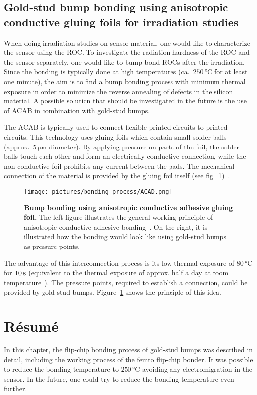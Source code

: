 \subsection{Gold-stud bump bonding using anisotropic conductive gluing foils for irradiation studies}
When doing irradiation studies on sensor material, one would like to characterize the sensor using the \ac{ROC}. To investigate the radiation hardness of the \ac{ROC} and the sensor separately, one would like to bump bond \ac{ROC}s after the irradiation. Since the bonding is typically done at high temperatures (ca.~$250\,\si{\degreeCelsius}$ for at least one minute), the aim is to find a bump bonding process with minimum thermal exposure in order to minimize the reverse annealing of defects in the silicon material. A possible solution that should be investigated in the future is the use of \ac{ACAB} in combination with gold-stud bumps.

The \ac{ACAB} is typically used to connect flexible printed circuits to printed circuits. This technology uses gluing foils which contain small solder balls (approx.~$5\,\si{\micro \meter}$ diameter). By applying pressure on parts of the foil, the solder balls touch each other and form an electrically conductive connection, while the non-conductive foil prohibits any current between the pads. The mechanical connection of the material is provided by the gluing foil itself (see fig.~\ref{fig:ASAB})~\cite{MIY10}.
\begin{figure}
\begin{center}
\texttt{[image: pictures/bonding\_process/ACAD.png]}
\end{center}
\caption[Bump bonding using anisotropic conductive adhesive gluing foil]{\textbf{Bump bonding using anisotropic conductive adhesive gluing foil.} The left figure illustrates the general working principle of anisotropic conductive adhesive bonding~\cite{MIY10}. On the right, it is illustrated how the bonding would look like using gold-stud bumps as pressure points.}\label{fig:ASAB}
\end{figure}

The advantage of this interconnection process is its low thermal exposure of $80\,\si{\degreeCelsius}$ for $10\,\rm{s}$ (equivalent to the thermal exposure of approx. half a day at room temperature~\cite{Mol99}). The pressure points, required to establish a connection, could be provided by gold-stud bumps. Figure~\ref{fig:ASAB} shows the principle of this idea.

\section{R\'{e}sum\'{e}}
In this chapter, the flip-chip bonding process of gold-stud bumps was described in detail, including the working process of the femto flip-chip bonder. It was possible to reduce the bonding temperature to $250\,\si{\degreeCelsius}$ avoiding any electromigration in the sensor. In the future, one could try to reduce the bonding temperature even further. 

